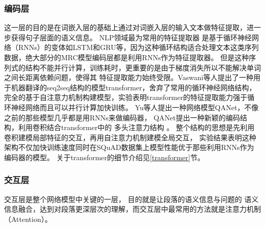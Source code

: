 \subsubsection{编码层}
这一层的目的是在词嵌入层的基础上通过对词嵌入层的输入文本做特征提取，进一步获得句子层面的语义信息。
NLP领域最为常用的特征提取器
是基于循环神经网络（RNNs）的变体如LSTM和GRU等，因为这种循环结构适合处理文本这类序列数据，绝大部分的MRC模型编码层都是利用RNNs作为特征提取器。
但是这种序列式的结构不能并行计算，训练耗时，更重要的是由于梯度消失所以不能解决单词之间长距离依赖问题，使得其
特征提取能力始终受限。Vaswani等人提出了一种用于机器翻译的seq2seq结构的模型transformer，舍弃了常用的循环神经网络结构，完全的基于自注意力机制构建模型，实验表明transformer的特征提取能力强于循环神经网络而且可以并行计算加快训练。
Yu等人提出一种网络模型QANet，不像之前的那些模型几乎都是用RNNs来做编码器，
QANet提出一种新颖的编码结构，利用卷积结合transformer中的
多头注意力结构
。
整个结构的思想是先利用卷积建模局部特征的交互，再用自注意力机制建模全局交互，
实验结果表明这种架构不仅加快训练速度同时在SQuAD数据集上模型性能优于那些利用RNNs作为编码器的模型。
关于transformer的细节介绍见\ref{transformer}节。



\subsubsection{交互层}
交互层是整个网络模型中关键的一层，
目的就是让段落的语义信息与问题的
语义信息融合，达到对段落更深层次的理解，而交互层中最常用的方法就是注意力机制（Attention）。

